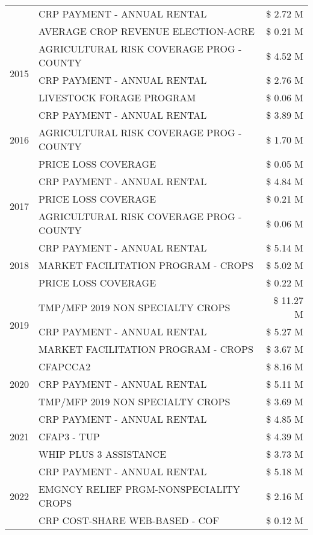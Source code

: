 \begin{tabular}{llr}
 & CRP PAYMENT - ANNUAL RENTAL & \$ 2.72 M \\
 & AVERAGE CROP REVENUE ELECTION-ACRE & \$ 0.21 M \\
\cline{1-3}
\multirow[t]{3}{*}{2015} & AGRICULTURAL RISK COVERAGE PROG - COUNTY & \$ 4.52 M \\
 & CRP PAYMENT - ANNUAL RENTAL & \$ 2.76 M \\
 & LIVESTOCK FORAGE PROGRAM & \$ 0.06 M \\
\cline{1-3}
\multirow[t]{3}{*}{2016} & CRP PAYMENT - ANNUAL RENTAL & \$ 3.89 M \\
 & AGRICULTURAL RISK COVERAGE PROG - COUNTY & \$ 1.70 M \\
 & PRICE LOSS COVERAGE & \$ 0.05 M \\
\cline{1-3}
\multirow[t]{3}{*}{2017} & CRP PAYMENT - ANNUAL RENTAL & \$ 4.84 M \\
 & PRICE LOSS COVERAGE & \$ 0.21 M \\
 & AGRICULTURAL RISK COVERAGE PROG - COUNTY & \$ 0.06 M \\
\cline{1-3}
\multirow[t]{3}{*}{2018} & CRP PAYMENT - ANNUAL RENTAL & \$ 5.14 M \\
 & MARKET FACILITATION PROGRAM - CROPS & \$ 5.02 M \\
 & PRICE LOSS COVERAGE & \$ 0.22 M \\
\cline{1-3}
\multirow[t]{3}{*}{2019} & TMP/MFP 2019 NON SPECIALTY CROPS & \$ 11.27 M \\
 & CRP PAYMENT - ANNUAL RENTAL & \$ 5.27 M \\
 & MARKET FACILITATION PROGRAM - CROPS & \$ 3.67 M \\
\cline{1-3}
\multirow[t]{3}{*}{2020} & CFAPCCA2 & \$ 8.16 M \\
 & CRP PAYMENT - ANNUAL RENTAL & \$ 5.11 M \\
 & TMP/MFP 2019 NON SPECIALTY CROPS & \$ 3.69 M \\
\cline{1-3}
\multirow[t]{3}{*}{2021} & CRP PAYMENT - ANNUAL RENTAL & \$ 4.85 M \\
 & CFAP3 - TUP & \$ 4.39 M \\
 & WHIP PLUS 3 ASSISTANCE & \$ 3.73 M \\
\cline{1-3}
\multirow[t]{3}{*}{2022} & CRP PAYMENT - ANNUAL RENTAL & \$ 5.18 M \\
 & EMGNCY RELIEF PRGM-NONSPECIALITY CROPS & \$ 2.16 M \\
 & CRP COST-SHARE WEB-BASED - COF & \$ 0.12 M \\
\cline{1-3}
\bottomrule
\end{tabular}
